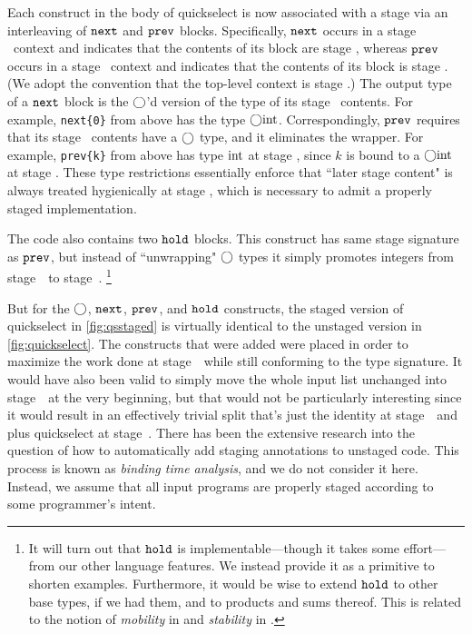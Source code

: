 Each construct in the body of quickselect is now associated with a stage via an interleaving of ${\tt next}$ and ${\tt prev}$ blocks.  
Specifically, ${\tt next}$ occurs in a stage \bbone\ context and indicates that the contents of its block are stage \bbtwo, 
whereas ${\tt prev}$ occurs in a stage \bbtwo\ context and indicates that the contents of its block is stage \bbone.
(We adopt the convention that the top-level context is stage \bbone.)
The output type of a ${\tt next}$ block is the $\bigcirc$'d version of the type of its stage \bbtwo\ contents.  
For example, \verb|next{0}| from above has the type $\bigcirc{\rm int}$.
Correspondingly, ${\tt prev}$ requires that its stage \bbone\ contents have a $\bigcirc$ type, and it eliminates the wrapper.
For example, \verb|prev{k}| from above has type ${\rm int}$ at stage \bbtwo, since $k$ is bound to a $\bigcirc{\rm int}$ at stage \bbone.
These type restrictions essentially enforce that ``later stage content" is always treated hygienically at stage \bbone,
which is necessary to admit a properly staged implementation.

The code also contains two ${\tt hold}$ blocks.  
This construct has same stage signature as ${\tt prev}$,
but instead of ``unwrapping" $\bigcirc$ types it simply promotes integers from stage~\bbone\ to stage~\bbtwo.
\footnote{It will turn out that ${\tt hold}$ is implementable---though it takes some effort---from our other language features.
We instead provide it as a primitive to shorten examples.  
Furthermore, it would be wise to extend ${\tt hold}$ to other base types, if we had them, and to products and sums thereof.
This is related to the notion of {\em mobility} in \cite{murphy05} and {\em stability} in \cite{krishnaswami13}.}

But for the $\bigcirc$, ${\tt next}$, ${\tt prev}$, and ${\tt hold}$ constructs, 
the staged version of quickselect in \ref{fig:qsstaged} is virtually identical to the unstaged version in \ref{fig:quickselect}.
The constructs that were added were placed in order to maximize the work done at stage~\bbone\ while still conforming to the type signature.
It would have also been valid to simply move the whole input list unchanged into stage~\bbtwo\ at the very beginning, 
but that would not be particularly interesting since it would result in an effectively trivial split 
that's just the identity at stage~\bbone\ and plus quickselect at stage~\bbtwo.
There has been the extensive research into the question of how to automatically add staging annotations to unstaged code.
This process is known as {\em binding time analysis}, and we do not consider it here.
Instead, we assume that all input programs are properly staged according to some programmer's intent.
